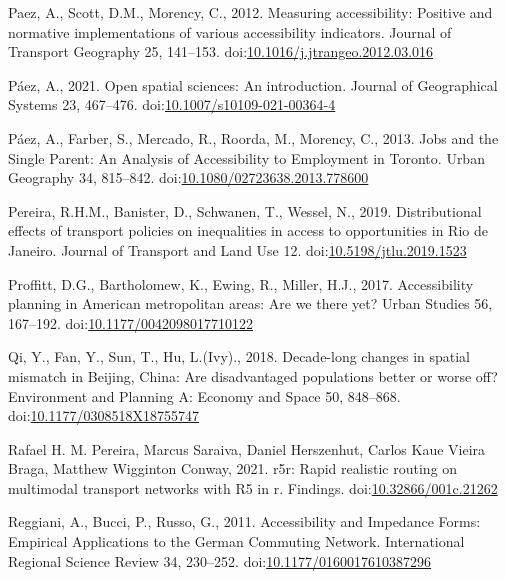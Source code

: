 \documentclass[]{elsarticle} %
\newlength{\cslhangindent}
\newlength{\cslentryspacingunit} %
\newenvironment{CSLReferences}[2] %
 {%
  \setlength{\parindent}{0pt}
  \ifodd #1
  \let\oldpar\par
  \def\par{\hangindent=\cslhangindent\oldpar}
  \fi
  \setlength{\parskip}{#2\cslentryspacingunit}
 }%
 {}
\begin{document}
\begin{CSLReferences}{1}{0}
\leavevmode{}%
Paez, A., Scott, D.M., Morency, C., 2012. Measuring accessibility:
Positive and normative implementations of various accessibility
indicators. Journal of Transport Geography 25, 141--153.
doi:\href{https://doi.org/10.1016/j.jtrangeo.2012.03.016}{10.1016/j.jtrangeo.2012.03.016}

\leavevmode{}%
Páez, A., 2021. Open spatial sciences: An introduction. Journal of
Geographical Systems 23, 467--476.
doi:\href{https://doi.org/10.1007/s10109-021-00364-4}{10.1007/s10109-021-00364-4}

\leavevmode{}%
Páez, A., Farber, S., Mercado, R., Roorda, M., Morency, C., 2013. Jobs
and the {Single} {Parent}: {An} {Analysis} of {Accessibility} to
{Employment} in {Toronto}. Urban Geography 34, 815--842.
doi:\href{https://doi.org/10.1080/02723638.2013.778600}{10.1080/02723638.2013.778600}

\leavevmode{}%
Pereira, R.H.M., Banister, D., Schwanen, T., Wessel, N., 2019.
Distributional effects of transport policies on inequalities in access
to opportunities in {Rio} de {Janeiro}. Journal of Transport and Land
Use 12.
doi:\href{https://doi.org/10.5198/jtlu.2019.1523}{10.5198/jtlu.2019.1523}

\leavevmode{}%
Proffitt, D.G., Bartholomew, K., Ewing, R., Miller, H.J., 2017.
Accessibility planning in American metropolitan areas: Are we there yet?
Urban Studies 56, 167--192.
doi:\href{https://doi.org/10.1177/0042098017710122}{10.1177/0042098017710122}

\leavevmode{}%
Qi, Y., Fan, Y., Sun, T., Hu, L.(Ivy)., 2018. Decade-long changes in
spatial mismatch in {Beijing}, {China}: {Are} disadvantaged populations
better or worse off? Environment and Planning A: Economy and Space 50,
848--868.
doi:\href{https://doi.org/10.1177/0308518X18755747}{10.1177/0308518X18755747}

\leavevmode{}%
Rafael H. M. Pereira, Marcus Saraiva, Daniel Herszenhut, Carlos Kaue
Vieira Braga, Matthew Wigginton Conway, 2021. r5r: Rapid realistic
routing on multimodal transport networks with R5 in r. Findings.
doi:\href{https://doi.org/10.32866/001c.21262}{10.32866/001c.21262}

\leavevmode{}%
Reggiani, A., Bucci, P., Russo, G., 2011. Accessibility and {Impedance}
{Forms}: {Empirical} {Applications} to the {German} {Commuting}
{Network}. International Regional Science Review 34, 230--252.
doi:\href{https://doi.org/10.1177/0160017610387296}{10.1177/0160017610387296}


\end{CSLReferences}
\end{document}
